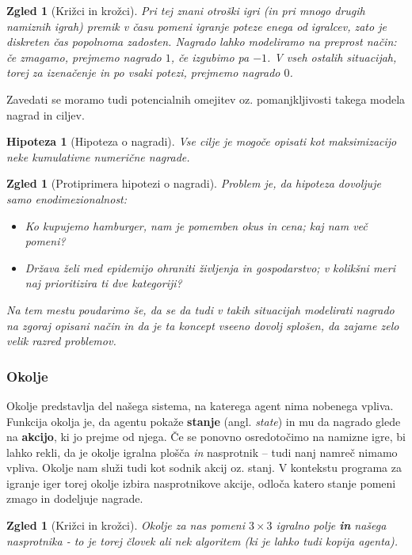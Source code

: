\documentclass[12pt,a4paper]{amsart}
\theoremstyle{definition} %
\theoremstyle{plain} %
\newtheorem{zgled}[definicija]{Zgled}
\newtheorem{hipoteza}[definicija]{Hipoteza}
\begin{document}
\begin{zgled}[Križci in krožci]
    Pri tej znani otroški igri (in pri mnogo drugih namiznih igrah) premik v času pomeni 
    igranje poteze enega od igralcev, zato je diskreten čas popolnoma zadosten. Nagrado lahko
    modeliramo na preprost način: če zmagamo, prejmemo nagrado $1$, če izgubimo pa $-1$. 
    V vseh ostalih situacijah, torej za izenačenje in po vsaki potezi, prejmemo nagrado $0$.
\end{zgled}

Zavedati se moramo tudi potencialnih omejitev oz. pomanjkljivosti takega modela nagrad in ciljev. 
\begin{hipoteza}[Hipoteza o nagradi]
    Vse cilje je mogoče opisati kot maksimizacijo neke kumulativne numerične 
    nagrade.
\end{hipoteza}

\begin{zgled}[Protiprimera hipotezi o nagradi]
    Problem je, da hipoteza dovoljuje samo enodimezionalnost:
    \begin{itemize}
        \item Ko kupujemo hamburger, nam je pomemben okus in cena; kaj nam več pomeni?
        \item Država želi med epidemijo ohraniti življenja in gospodarstvo; v kolikšni 
                meri naj prioritizira ti dve kategoriji?
    \end{itemize}
    Na tem mestu poudarimo še, da se da tudi v takih situacijah modelirati nagrado na zgoraj 
    opisani način in da je ta koncept vseeno dovolj splošen, da zajame zelo velik razred problemov.
    
\end{zgled}

\subsubsection{Okolje}
Okolje predstavlja del našega sistema, na katerega agent nima nobenega vpliva. Funkcija okolja
je, da agentu pokaže \textbf{stanje} (angl. \textit{state}) in mu da nagrado glede na 
\textbf{akcijo}, ki jo prejme od njega. Če se ponovno osredotočimo na namizne igre, bi lahko rekli, 
da je okolje igralna plošča \textit{in} nasprotnik  -- tudi nanj namreč nimamo vpliva. Okolje nam 
služi tudi kot sodnik akcij oz. stanj. V kontekstu programa za igranje iger torej okolje izbira 
nasprotnikove akcije, odloča katero stanje pomeni zmago in dodeljuje nagrade.

\begin{zgled}[Križci in krožci]
    Okolje za nas pomeni $3\times3$ igralno polje \textbf{in} našega nasprotnika - to je torej človek 
    ali nek algoritem (ki je lahko tudi kopija agenta).
\end{zgled}
\end{document}
